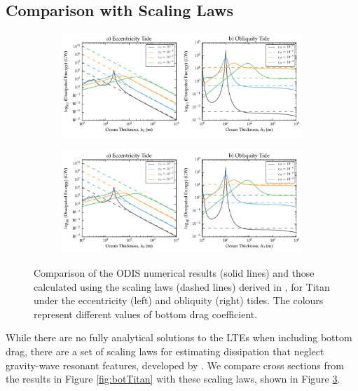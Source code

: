 \subsection{Comparison with Scaling Laws \label{subsec:scalTitan}}

\begin{figure}[!t]
    \centering
    \begin{subfigure}[t]{0.85\linewidth} %
        \includegraphics[width=\linewidth]{Figures/titan_scaling}
        \label{fig:scalEccTitan}
    \end{subfigure}
    \begin{subfigure}[t]{0\linewidth} %
         \includegraphics[width=\linewidth]{Figures/titan_scaling}
         \label{fig:scalObliqTitan} 
    \end{subfigure}
    \vspace{-0.5cm}
\caption{Comparison of the ODIS numerical results (solid lines) and those calculated using the scaling laws (dashed lines) derived in \citet{chen2013tidal}, for Titan under the eccentricity (left) and obliquity (right) tides. The colours represent different values of bottom drag coefficient.\label{fig:scalTitan}}
\end{figure}

While there are no fully analytical solutions to the LTEs when including bottom drag, there are a set of scaling laws for estimating dissipation that neglect gravity-wave resonant features, developed by \citet{chen2013tidal}. We compare cross sections from the results in Figure \ref{fig:botTitan} with these scaling laws, shown in Figure \ref{fig:scalTitan}.

